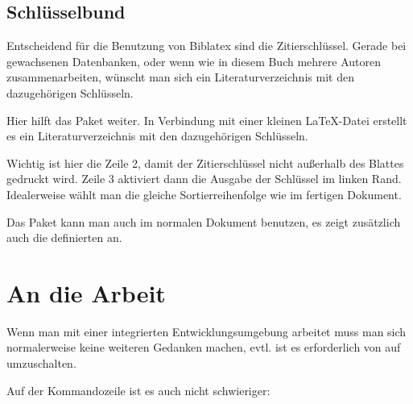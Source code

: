 \subsection{Schlüsselbund}

Entscheidend für die Benutzung von Biblatex sind die Zitierschlüssel.
Gerade bei gewachsenen Datenbanken,
oder wenn wie in diesem Buch mehrere Autoren zusammenarbeiten,
wünscht man sich ein Literaturverzeichnis mit den dazugehörigen Schlüsseln.

Hier hilft das Paket  weiter.
In Verbindung mit einer kleinen \LaTeX-Datei erstellt es ein Literaturverzeichnis mit den dazugehörigen Schlüsseln.


Wichtig ist hier die Zeile 2, damit der Zitierschlüssel nicht außerhalb des Blattes gedruckt wird.
Zeile 3 aktiviert dann die Ausgabe der Schlüssel im linken Rand.
Idealerweise wählt man die gleiche Sortierreihenfolge wie im fertigen Dokument.

Das Paket  kann man auch im normalen Dokument benutzen, 
es zeigt zusätzlich auch die definierten  an.

\section{An die Arbeit}

Wenn man mit einer integrierten Entwicklungsumgebung arbeitet muss man sich normalerweise keine weiteren Gedanken machen,
evtl. ist es erforderlich von  auf  umzuschalten.

Auf der Kommandozeile ist es auch nicht schwieriger:

